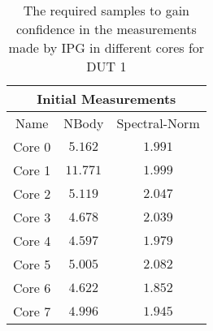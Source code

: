 \begin{table}[H]
    \centering
    \begin{tabular}{|| c | c | c ||}
    \hline
    \multicolumn{3}{||c||}{Initial Measurements} \\ [0.5ex] \hline\hline
    Name & NBody & Spectral-Norm \\\hline
    Core 0 & $5.162$ & $1.991$ \\
    Core 1 & $11.771$ & $1.999$ \\
    Core 2 & $5.119$ & $2.047$ \\
    Core 3 & $4.678$ & $2.039$ \\
    Core 4 & $4.597$ & $1.979$ \\
    Core 5 & $5.005$ & $2.082$ \\
    Core 6 & $4.622$ & $1.852$ \\
    Core 7 & $4.996$ & $1.945$ \\\hline
    \end{tabular}
    \caption{The required samples to gain confidence in the measurements made by IPG in different cores for DUT 1}
    \label{tab:initial-measurements-exp-3-dut-1}
\end{table}